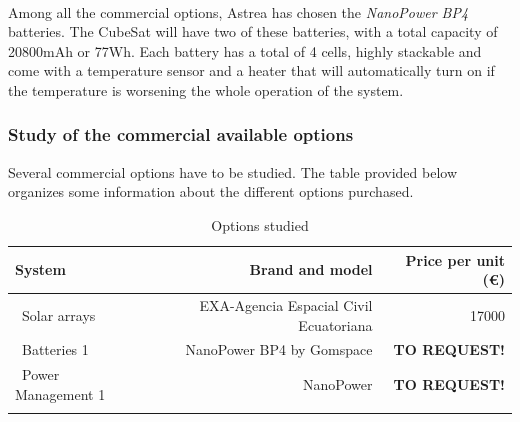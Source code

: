 \paragraph{}Among all the commercial options, Astrea has chosen the \textit{NanoPower BP4} batteries. The CubeSat will have two of these batteries, with a total capacity of 20800mAh or 77Wh. Each battery has a total of 4 cells, highly stackable and come with a temperature sensor and a heater that will automatically turn on if the temperature is worsening the whole operation of the system. 

\subsubsection{Study of the commercial available options}
Several commercial options have to be studied. The table provided below organizes some information about the different options purchased.

\begin{longtable}{| l | r | r | }
\hline
\rowcolor[gray]{0.80}	\textbf{System} &  \textbf{Brand and model}     & \textbf{Price per unit (\euro)}   \\
\hline
\endfirsthead

	   ~Solar arrays & EXA-Agencia Espacial Civil Ecuatoriana & 17000 \\
	   ~Batteries 1 & NanoPower BP4 by Gomspace & \textbf{TO REQUEST!} \\
	   ~Power Management 1 & NanoPower & \textbf{TO REQUEST!} \\
	\hline

\caption{Options studied}
\label{epsoptionstable}
\end{longtable}